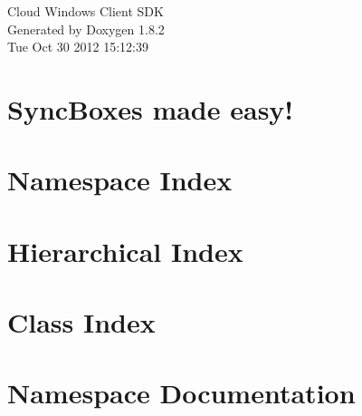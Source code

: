 \documentclass{book}
\begin{document}
\hypersetup{pageanchor=false,citecolor=blue}
\begin{titlepage}
\vspace*{7cm}
\begin{center}
{\Large Cloud Windows Client S\-D\-K }\\
\vspace*{1cm}
{\large Generated by Doxygen 1.8.2}\\
\vspace*{0.5cm}
{\small Tue Oct 30 2012 15:12:39}\\
\end{center}
\end{titlepage}
\clearemptydoublepage
{}
\tableofcontents
\clearemptydoublepage
{}
\hypersetup{pageanchor=true,citecolor=blue}
\chapter{Sync\-Boxes made easy!}
\label{index}\hypertarget{index}{}
\chapter{Namespace Index}

\chapter{Hierarchical Index}

\chapter{Class Index}

\chapter{Namespace Documentation}


















\end{document}
